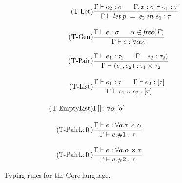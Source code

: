 \begin{figure}[htb]
\begin{align*}
\tag{T-Let}
&\frac{\Gamma \vdash e_{2}:\sigma \;\;\;\;\;\; \Gamma, x:\sigma \vdash e_{1}:\tau}
{\Gamma \vdash let\;p\;=\;e_{2}\;in\;e_{1}:\tau}
\\[1em]
\tag{T-Gen}
&\frac{\Gamma \vdash e:\sigma \;\;\;\;\;\; \alpha \not\in \mathit{free(\Gamma)}}{\Gamma \vdash e : \forall \alpha . \sigma}
\\[1em]
\tag{T-Pair}
&\frac
{\Gamma \vdash e_{1}:\tau_{1} \;\;\;\;\;\; \Gamma \vdash e_{2}:\tau_{2})}
{\Gamma \vdash (e_{1},e_{2}):\tau_{1} \times \tau_{2}}
\\[1em]
\tag{T-List}
&\frac
{\Gamma \vdash e_{1}:\tau \;\;\;\;\;\; \Gamma \vdash e_{2}:[\tau]}
{\Gamma \vdash e_{1}::e_{2}:[\tau]}
\\[1em]
\tag{T-EmptyList}
&\Gamma [] : \forall \alpha.[\alpha]
\\[1em]
\tag{T-PairLeft}
&\frac
{\Gamma \vdash e:\forall \alpha . \tau \times \alpha}
{\Gamma \vdash e.\#1:\tau}
\\[1em]
\tag{T-PairLeft}
&\frac
{\Gamma \vdash e:\forall \alpha . \alpha \times \tau}
{\Gamma \vdash e.\#2:\tau}
\end{align*}
\caption[Typing Rules: Core Language]{Typing rules for the Core language. \label{fig:TypeRulesCore}}
\end{figure}

